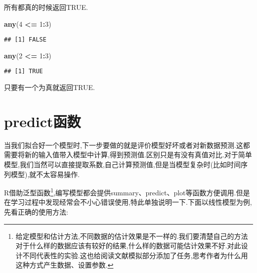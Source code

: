 \documentclass[]{ctexbook}
\newenvironment{Shaded}{\begin{snugshade}}{\end{snugshade}}
\newcommand{\DecValTok}[1]{\textcolor[rgb]{0.00,0.00,0.81}{#1}}
\newcommand{\KeywordTok}[1]{\textcolor[rgb]{0.13,0.29,0.53}{\textbf{#1}}}
\newcommand{\NormalTok}[1]{#1}
\newcommand{\OperatorTok}[1]{\textcolor[rgb]{0.81,0.36,0.00}{\textbf{#1}}}
\newcommand{\StringTok}[1]{\textcolor[rgb]{0.31,0.60,0.02}{#1}}
\begin{document}
所有都真的时候返回TRUE.

\begin{Shaded}
\begin{Highlighting}[]
\KeywordTok{any}\NormalTok{(}\DecValTok{4} \OperatorTok{<=}\StringTok{ }\DecValTok{1}\OperatorTok{:}\DecValTok{3}\NormalTok{)}
\end{Highlighting}
\end{Shaded}

\begin{verbatim}
## [1] FALSE
\end{verbatim}

\begin{Shaded}
\begin{Highlighting}[]
\KeywordTok{any}\NormalTok{(}\DecValTok{2} \OperatorTok{<=}\StringTok{ }\DecValTok{1}\OperatorTok{:}\DecValTok{3}\NormalTok{)}
\end{Highlighting}
\end{Shaded}

\begin{verbatim}
## [1] TRUE
\end{verbatim}

只要有一个为真就返回TRUE.

\hypertarget{predict}{%
\section{predict函数}\label{predict}}

当我们拟合好一个模型时,下一步要做的就是评价模型好坏或者对新数据预测.这都需要将新的输入值带入模型中计算,得到预测值.区别只是有没有真值对比.对于简单模型,我们当然可以直接提取系数,自己计算预测值,但是当模型复杂时(比如时间序列模型),就不太容易操作.

R借助泛型函数\footnote{给定模型和估计方法,不同数据的估计效果是不一样的.我们要清楚自己的方法对于什么样的数据应该有较好的结果,什么样的数据可能估计效果不好.对此设计不同代表性的实验.这也给阅读文献模拟部分添加了任务,思考作者为什么用这种方式产生数据、设置参数.},编写模型都会提供summary、predict、plot等函数方便调用.但是在学习过程中发现经常会不小心错误使用,特此单独说明一下.下面以线性模型为例,先看正确的使用方法:
\end{document}

